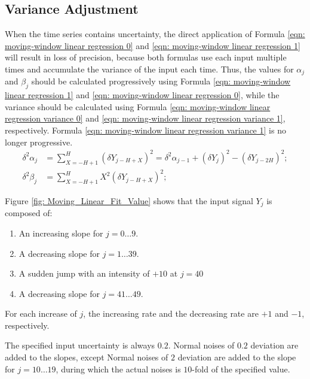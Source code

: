 \documentclass[twoside]{article}
\numberwithin{equation}{section}
\begin{document}
\subsection{Variance Adjustment} 

When the time series contains uncertainty, the direct application of Formula \eqref{eqn: moving-window linear regression 0} and \eqref{eqn: moving-window linear regression 1} will result in loss of precision, because both formulas use each input multiple times and accumulate the variance of the input each time.
Thus, the values for $\alpha_j$ and $\beta_j$ should be calculated progressively using Formula \eqref{eqn: moving-window linear regression 1} and \eqref{eqn: moving-window linear regression 0}, while the variance should be calculated using Formula \eqref{eqn: moving-window linear regression variance 0} and \eqref{eqn: moving-window linear regression variance 1}, respectively.
Formula \eqref{eqn: moving-window linear regression variance 1} is no longer progressive.
\begin{align}
\label{eqn: moving-window linear regression variance 0}
\delta^2 \alpha_{j} &= \sum_{X=-H+1}^{H} (\delta Y_{j-H+X})^2 = \delta^2 \alpha_{j-1} + (\delta Y_{j})^2 - (\delta Y_{j-2H})^2; \\
\label{eqn: moving-window linear regression variance 1}
\delta^2 \beta_{j} &= \sum_{X=-H+1}^{H} X^2 (\delta Y_{j-H+X})^2;
\end{align}

Figure \ref{fig: Moving_Linear_Fit_Value} shows that the input signal $Y_j$ is composed of:
\begin{enumerate}
\item An increasing slope for $j = 0 \dots 9$.

\item A decreasing slope for $j = 1 \dots 39$.

\item A sudden jump with an intensity of $+10$ at $j=40$

\item A decreasing slope for $j = 41 \dots 49$.
\end{enumerate}
For each increase of $j$, the increasing rate and the decreasing rate are $+1$ and $-1$, respectively.

The specified input uncertainty is always $0.2$.
Normal noises of $0.2$ deviation are added to the slopes, except Normal noises of $2$ deviation are added to the slope for $j = 10 \dots 19$, during which the actual noises is $10$-fold of the specified value.
\end{document}
